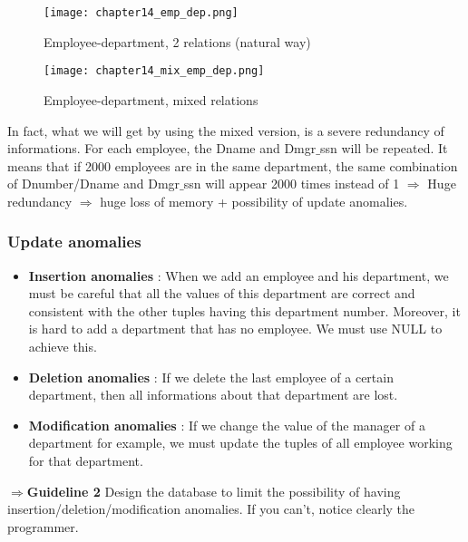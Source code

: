 \begin{figure}[!h]
    \centering
    \texttt{[image: chapter14\_emp\_dep.png]}
    \caption{Employee-department, 2 relations (natural way)}
    \label{fig:empdep}
\end{figure}

\begin{figure}[!h]
    \centering
    \texttt{[image: chapter14\_mix\_emp\_dep.png]}
    \caption{Employee-department, mixed relations }
    \label{fig:mixempdep}
\end{figure}

In fact, what we will get by using the mixed version, is a severe redundancy of informations. For each employee, the Dname and Dmgr$\_$ssn will be repeated. It means that if 2000 employees are in the same department, the same combination of Dnumber/Dname and Dmgr$\_$ssn will appear 2000 times instead of 1 $\Rightarrow$ Huge redundancy $\Rightarrow$ huge loss of memory + possibility of update anomalies.
\newpage
\subsubsection{Update anomalies}
\begin{itemize}
    \item \textbf{Insertion anomalies} : When we add an employee and his department, we must be careful that all the values of this department are correct and consistent with the other tuples having this department number. Moreover, it is hard to add a department that has no employee. We must use NULL to achieve this.
    \item \textbf{Deletion anomalies} : If we delete the last employee of a certain department, then all informations about that department are lost.
    \item \textbf{Modification anomalies} : If we change the value of the manager of a department for example, we must update the tuples of all employee working for that department.\\
\end{itemize}
$\Rightarrow$\textbf{Guideline 2 } Design the database to limit the possibility of having insertion/deletion/modification anomalies. If you can't, notice clearly the programmer.

